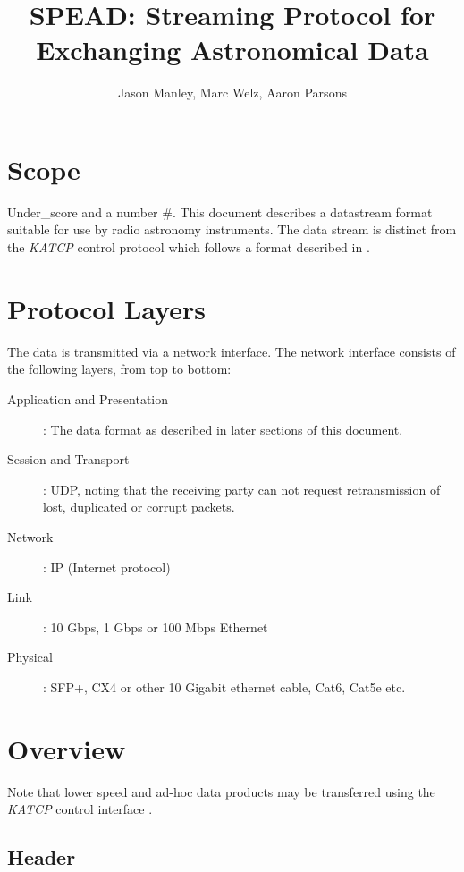 \documentclass[11pt,english,twoside]{article}
\begin{document}
\title{SPEAD: Streaming Protocol for Exchanging Astronomical Data}
\author{Jason Manley, Marc Welz, Aaron Parsons}


\section{Scope}

Under\_score and a number \#.
This document describes a datastream format suitable for use by radio astronomy instruments. The data stream is distinct from the \emph{KATCP} control protocol which follows a format described in \cite{ffdbectl}. 

\section{Protocol Layers}

The data is transmitted via a network interface. The network interface consists of the following layers, from top to bottom:

\begin{description}

\item[Application and Presentation]: The data format as described in later sections of this document.

\item[Session and Transport]: UDP, noting that the receiving party can not request retransmission of lost, duplicated or corrupt packets.

\item[Network]: IP (Internet protocol)

\item[Link]: 10 Gbps, 1 Gbps or 100 Mbps Ethernet

\item[Physical]: SFP+, CX4 or other 10 Gigabit ethernet cable, Cat6, Cat5e etc.

\end{description}

\section{Overview}

Note that lower speed and ad-hoc data products may be transferred using the \emph{KATCP} control interface \cite{ffdbectl}.

\subsection{Header}
\end{document}
